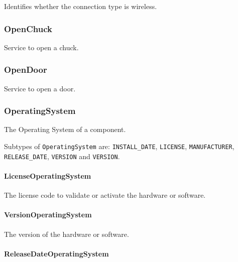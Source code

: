 Identifies whether the connection type is wireless.


\subsubsection{OpenChuck}
\label{sec:OpenChuck}



Service to open a chuck.

\FloatBarrier

\subsubsection{OpenDoor}
\label{sec:OpenDoor}



Service to open a door.

\FloatBarrier

\subsubsection{OperatingSystem}
\label{sec:OperatingSystem}



The Operating System of a component.


Subtypes of \texttt{OperatingSystem} are: \texttt{INSTALL_DATE}, \texttt{LICENSE}, \texttt{MANUFACTURER}, \texttt{RELEASE_DATE}, \texttt{VERSION} and \texttt{VERSION}. 
\FloatBarrier

\paragraph{LicenseOperatingSystem}\mbox{}
\label{sec:LicenseOperatingSystem}



The license code to validate or activate the hardware or software.


\paragraph{VersionOperatingSystem}\mbox{}
\label{sec:VersionOperatingSystem}



The version of the hardware or software.


\paragraph{ReleaseDateOperatingSystem}\mbox{}
\label{sec:ReleaseDateOperatingSystem}



